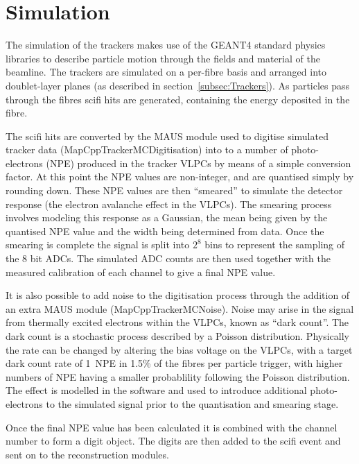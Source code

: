 \section{Simulation}
\label{sec:Simulation}

The simulation of the trackers makes use of the GEANT4 standard physics libraries to describe particle motion through the fields and material of the beamline. The trackers are simulated on a per-fibre basis and arranged into doublet-layer planes (as described in section~\ref{subsec:Trackers}). As particles pass through the fibres scifi hits are generated, containing the energy deposited in the fibre. 

The scifi hits are converted by the MAUS module used to digitise simulated tracker data (MapCppTrackerMCDigitisation) into to a number of photo-electrons (NPE) produced in the tracker VLPCs by means of a simple conversion factor. At this point the NPE values are non-integer, and are quantised simply by rounding down. These NPE values are then ``smeared'' to simulate the detector response (the electron avalanche effect in the VLPCs). The smearing process involves modeling this response as a Gaussian, the mean being given by the quantised NPE value and the width being determined from data. Once the smearing is complete the signal is split into $2^8$ bins to represent the sampling of the 8 bit ADCs. The simulated ADC counts are then used together with the measured calibration of each channel to give a final NPE value.

It is also possible to add noise to the digitisation process through the addition of an extra MAUS module (MapCppTrackerMCNoise). Noise may arise in the signal from thermally excited electrons within the VLPCs, known as ``dark count''. The dark count is a stochastic process described by a Poisson distribution. Physically the rate can be changed by altering the bias voltage on the VLPCs, with a target dark count rate of 1~NPE in 1.5\% of the fibres per particle trigger, with higher numbers of NPE having a smaller probablility following the Poisson distribution. The effect is modelled in the software and used to introduce additional photo-electrons to the simulated signal prior to the quantisation and smearing stage. 

Once the final NPE value has been calculated it is combined with the channel number to form a digit object. The digits are then added to the scifi event and sent on to the reconstruction modules.




